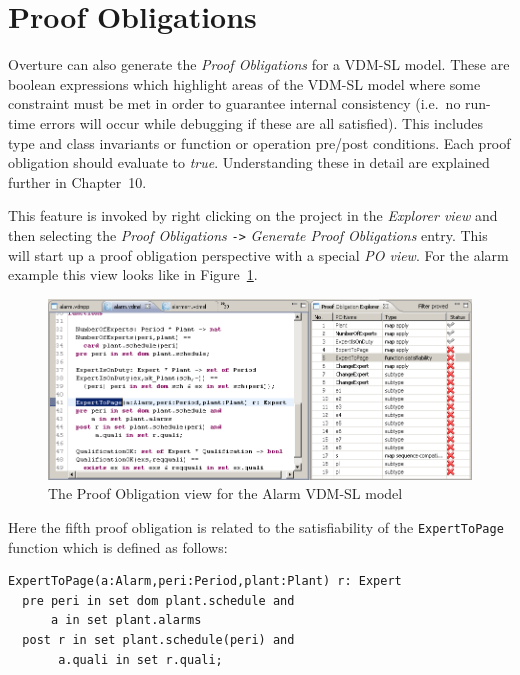 {\section{Proof Obligations}\label{sec:POtool}

Overture can also generate the \emph{Proof Obligations} for a VDM-SL
model. These are boolean expressions which highlight areas of the
VDM-SL model where some constraint must be met in order to guarantee
internal consistency (i.e.\ no run-time errors will occur while
debugging if these are all satisfied). This includes type and class
invariants or function or operation pre/post conditions. Each proof
obligation should evaluate to \emph{true}. Understanding these in
detail are explained further in Chapter~10.

This feature is invoked by right clicking on the project in the
\emph{Explorer view} and then selecting the \emph{Proof Obligations}
\texttt{->} \emph{Generate Proof Obligations} entry. This will start up a proof
obligation perspective with a special \emph{PO view}. For the alarm
example this view looks like in Figure~\ref{fig:POview}.
\begin{figure}[htbp]
\begin{center}
\includegraphics[width=5.5in]{figures/POview}
\caption{The Proof Obligation view for the Alarm VDM-SL model\label{fig:POview}}
\end{center}
\end{figure}
Here the fifth proof obligation is related to the satisfiability of
the \texttt{ExpertToPage} function which is defined as follows: 

\begin{lstlisting}
ExpertToPage(a:Alarm,peri:Period,plant:Plant) r: Expert
  pre peri in set dom plant.schedule and
      a in set plant.alarms
  post r in set plant.schedule(peri) and
       a.quali in set r.quali;
\end{lstlisting}


}
